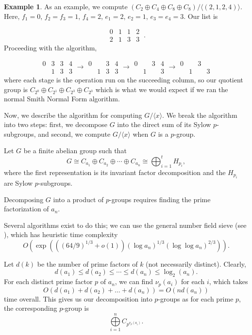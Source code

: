 \documentclass[11pt]{amsart}
\theoremstyle{definition}
\newtheorem{ex}[lem]{Example}
\newcommand{\setx}{\langle x \rangle}
\renewcommand{\leq}{\leqslant}
\numberwithin{equation}{section}
\begin{document}
\begin{ex}
As an example, we compute $(C_2\oplus C_4\oplus C_8\oplus C_8)/ \langle (2, 1, 2, 4) \rangle$. Here, $f_1 = 0$, $f_2 = f_3 = 1$, $f_4 = 2$, $e_1 = 2$, $e_2 = 1$, $e_3 = e_4 = 3$. Our list is 

\[\displaystyle \begin{matrix}
0 & 1 & 1 & 2\\
2 & 1 & 3 & 3
\end{matrix} \ .\]
Proceeding with the algorithm, 

\[\begin{matrix}
0 & 3 & 3 & 4\\
 & 1 & 3 & 3
\end{matrix}
\rightarrow 
\begin{matrix}
0 &  & 3 & 4\\
 & 1 & 3 & 3
\end{matrix}
\rightarrow
\begin{matrix}
0 &  & 3 & 4\\
 & 1 &  & 3
\end{matrix}
\rightarrow
\begin{matrix}
0 &  & 3 & \\
 & 1 &  & 3
\end{matrix}
\]
where each stage is the operation run on the succeeding column, so our quotient group is $C_{2^0}\oplus C_{2^1}\oplus C_{2^3}\oplus C_{2^3}$ which is what we would expect if we ran the normal Smith Normal Form algorithm.
\end{ex}


Now, we describe the algorithm for computing $G /\setx$. We break the algorithm into two steps: first, we decompose $G$ into the direct sum of its Sylow $p$-subgroups, and second, we compute $G/\langle x \rangle$ when $G$ is a $p$-group.

Let $G$ be a finite abelian group such that 
$$
G \cong C_{a_1} \oplus C_{a_2} \oplus \cdots \oplus C_{a_n} \cong \bigoplus_{i=1}^t H_{p_i},
$$
where the first representation is its invariant factor decomposition and the $H_{p_i}$ are Sylow $p$-subgroups. 

Decomposing $G$ into a product of $p$-groups requires finding the prime factorization of $a_n$. 

Several algorithms exist to do this; we can use the general number field sieve (see \cite{crandall}), which has heuristic time complexity
\[
O(\exp(((64/9)^{1/3} + o(1)) (\log a_n)^{1/3} (\log \log a_n)^{2/3})).
\]

Let $d(k)$ be the number of prime factors of $k$ (not necessarily distinct). Clearly, \[
d(a_1) \leq d(a_2) \leq \cdots \leq d(a_n) \leq \log_2(a_n).\] For each distinct prime factor $p$ of $a_n$, we can find $\nu_p(a_i)$ for each $i$, which takes \[O(d(a_1) + d(a_2) + \dots + d(a_n)) = O(nd(a_n))\] time overall. This gives us our decomposition into $p$-groups as for each prime $p$, the corresponding $p$-group is 
\[
\bigoplus\limits_{i=1}^n C_{p^{\nu_p(a_i)}} .
\]
\end{document}

